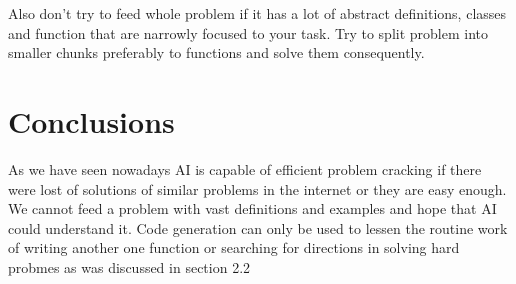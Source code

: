\documentclass[12pt]{report}
\begin{document}
		Also don't try to feed whole problem if it has a lot of abstract definitions, classes and function that are narrowly focused to your task. Try to split problem into smaller chunks preferably to functions and solve them consequently.
		
	\section{Conclusions}
		\qquad As we have seen nowadays AI is capable of efficient problem cracking if there were lost of solutions of similar problems in the internet or they are easy enough. We cannot feed a problem with vast definitions and examples and hope that AI could understand it. Code generation can only be used to lessen the routine work of writing another one function or searching for directions in solving hard probmes as was discussed in section 2.2
	
	
\end{document}
